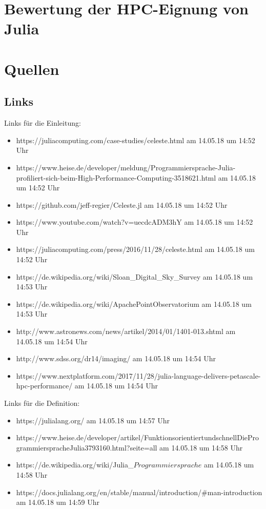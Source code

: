 \documentclass[proseminar,german,utf8]{zihpub}
\begin{document}
\section{Bewertung der HPC-Eignung von Julia}
\section{Quellen}
\subsection{Links}
Links für die Einleitung:
\begin{itemize}
\item https://juliacomputing.com/case-studies/celeste.html am 14.05.18 um 14:52 Uhr
\item https://www.heise.de/developer/meldung/Programmiersprache-Julia-profiliert-sich-beim-High-Performance-Computing-3518621.html am 14.05.18 um 14:52 Uhr
\item https://github.com/jeff-regier/Celeste.jl am 14.05.18 um 14:52 Uhr
\item https://www.youtube.com/watch?v=uecdcADM3hY am 14.05.18 um 14:52 Uhr
\item https://juliacomputing.com/press/2016/11/28/celeste.html am 14.05.18 um 14:52 Uhr
\item https://de.wikipedia.org/wiki/Sloan\_Digital\_Sky\_Survey am 14.05.18 um 14:53 Uhr
\item https://de.wikipedia.org/wiki/Apache\-Point\-Observatorium am 14.05.18 um 14:53 Uhr
\item http://www.astronews.com/news/artikel/2014/01/1401-013.shtml am 14.05.18 um 14:54 Uhr
\item http://www.sdss.org/dr14/imaging/ am 14.05.18 um 14:54 Uhr
\item https://www.nextplatform.com/2017/11/28/julia-language-delivers-petascale-hpc-performance/ am 14.05.18 um 14:54 Uhr
\end{itemize}

Links für die Definition:
\begin{itemize}
\item https://julialang.org/ am 14.05.18 um 14:57 Uhr
\item https://www.heise.de/developer/artikel/Funktionsorientiert\-und\-schnell\-Die\-Programmiersprache\-Julia\-3793160.html?seite=all am 14.05.18 um 14:58 Uhr
\item https://de.wikipedia.org/wiki/Julia\_\(Programmiersprache\) am 14.05.18 um 14:58 Uhr
\item https://docs.julialang.org/en/stable/manual/introduction/\#man-introduction am 14.05.18 um 14:59 Uhr
\end{itemize}
\end{document}
